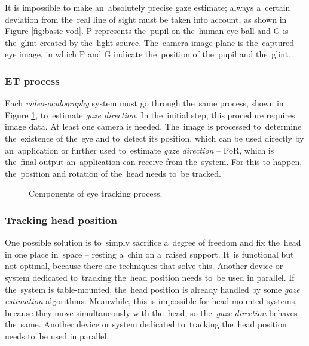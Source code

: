 It is impossible to make an~absolutely precise gaze estimate; always a~certain deviation from the~real line of sight must be taken into account, as shown in Figure \ref{fig:basic-vod}. P represents the~pupil on the~human eye ball and G is the~glint created by the~light source. The~camera image plane is the~captured eye image, in which P and G indicate the~position of the~pupil and the~glint.~\cite{anuradha2017review}

\subsubsection*{ET process}
Each \emph{video-oculography} system must go through the~same process, shown in Figure \ref{fig:ET-process}, to~estimate \emph{gaze direction}. In the~initial step, this procedure requires image data. At least one camera is needed. The~image is processed to~determine the~existence of the~eye and to~detect its position, which can be used directly by an~application or further used to~estimate \emph{gaze direction} -- PoR, which is the~final output an~application can receive from the~system. For this to happen, the~position and rotation of the~head needs to~be tracked.

\begin{figure}[!ht]\centering{}
    
    \caption[Components of eye tracking process.]{Components of eye tracking process.~\cite{fig:vbprocesscomponents}}
    \label{fig:ET-process}
\end{figure}

\subsubsection*{Tracking head position}
One possible solution is to~simply sacrifice a~degree of freedom and fix the~head in one place in~space -- resting a~chin on a~raised support. It~is functional but not optimal, because there are techniques that solve this. Another device or system dedicated to~tracking the~head position needs to~be used in parallel.
If the~system is table-mounted, the~head position is already handled by some \emph{gaze estimation} algorithms. %
Meanwhile, this is impossible for head-mounted systems, because they move simultaneously with the~head, so the~\emph{gaze direction} behaves the~same. Another device or system dedicated to~tracking the~head position needs to~be used in parallel.

